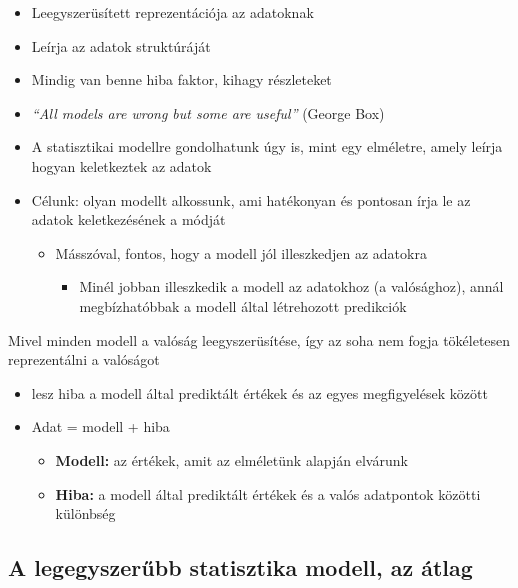 \documentclass[
  letterpaper,
  DIV=11,
  numbers=noendperiod]{scrreprt}
\providecommand{\tightlist}{%
  \setlength{\itemsep}{0pt}\setlength{\parskip}{0pt}}\usepackage{longtable,booktabs,array}
\begin{document}
\begin{itemize}
\item
  Leegyszerüsített reprezentációja az adatoknak
\item
  Leírja az adatok struktúráját
\item
  Mindig van benne hiba faktor, kihagy részleteket
\item
  \emph{``All models are wrong but some are useful''} (George Box)
\item
  A statisztikai modellre gondolhatunk úgy is, mint egy elméletre, amely
  leírja hogyan keletkeztek az adatok
\item
  Célunk: olyan modellt alkossunk, ami hatékonyan és pontosan írja le az
  adatok keletkezésének a módját

  \begin{itemize}
  \item
    Másszóval, fontos, hogy a modell jól illeszkedjen az adatokra

    \begin{itemize}
    \tightlist
    \item
      Minél jobban illeszkedik a modell az adatokhoz (a valósághoz),
      annál megbízhatóbbak a modell által létrehozott predikciók
    \end{itemize}
  \end{itemize}
\end{itemize}

Mivel minden modell a valóság leegyszerüsítése, így az soha nem fogja
tökéletesen reprezentálni a valóságot

\begin{itemize}
\item
  lesz hiba a modell által prediktált értékek és az egyes megfigyelések
  között
\item
  Adat = modell + hiba

  \begin{itemize}
  \item
    \textbf{Modell:} az értékek, amit az elméletünk alapján elvárunk
  \item
    \textbf{Hiba:} a modell által prediktált értékek és a valós
    adatpontok közötti különbség
  \end{itemize}
\end{itemize}

\hypertarget{a-legegyszerux171bb-statisztika-modell-az-uxe1tlag}{%
\subsection{A legegyszerűbb statisztika modell, az
átlag}\label{a-legegyszerux171bb-statisztika-modell-az-uxe1tlag}}
\end{document}
